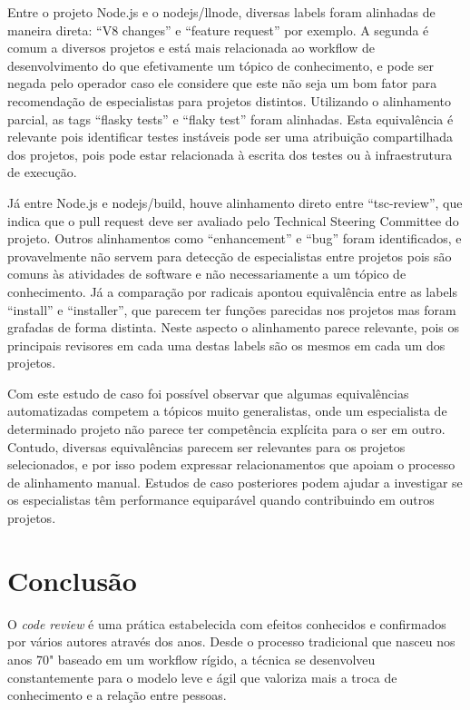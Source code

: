 \documentclass[sigconf]{acmart}
\begin{document}
Entre o projeto Node.js e o nodejs/llnode, diversas labels foram alinhadas de maneira direta: ``V8 changes'' e ``feature request'' por exemplo. A segunda é comum a diversos projetos e está mais relacionada ao workflow de desenvolvimento do que efetivamente um tópico de conhecimento, e pode ser negada pelo operador caso ele considere que este não seja um bom fator para recomendação de especialistas para projetos distintos. Utilizando o alinhamento parcial, as tags ``flasky tests'' e ``flaky test'' foram alinhadas. Esta equivalência é relevante pois identificar testes instáveis pode ser uma atribuição compartilhada dos projetos, pois pode estar relacionada à escrita dos testes ou à infraestrutura de execução.

Já entre Node.js e nodejs/build, houve alinhamento direto entre ``tsc-review'', que indica que o pull request deve ser avaliado pelo Technical Steering Committee do projeto. Outros alinhamentos como ``enhancement'' e ``bug'' foram identificados, e provavelmente não servem para detecção de especialistas entre projetos pois são comuns às atividades de software e não necessariamente a um tópico de conhecimento. Já a comparação por radicais apontou equivalência entre as labels ``install'' e ``installer'', que parecem ter funções parecidas nos projetos mas foram grafadas de forma distinta. Neste aspecto o alinhamento parece relevante, pois os principais revisores em cada uma destas labels são os mesmos em cada um dos projetos.

Com este estudo de caso foi possível observar que algumas equivalências automatizadas competem a tópicos muito generalistas, onde um especialista de determinado projeto não parece ter competência explícita para o ser em outro. Contudo, diversas equivalências parecem ser relevantes para os projetos selecionados, e por isso podem expressar relacionamentos que apoiam o processo de alinhamento manual. Estudos de caso posteriores podem ajudar a investigar se os especialistas têm performance equiparável quando contribuindo em outros projetos.

\section{Conclusão}\label{cha:conclusao}

O \textit{code review} é uma prática estabelecida com efeitos conhecidos e confirmados por vários autores através dos anos. Desde o processo tradicional que nasceu nos anos 70" baseado em um workflow rígido, a técnica se desenvolveu constantemente para o modelo leve e ágil que valoriza mais a troca de conhecimento e a relação entre pessoas.
\end{document}

